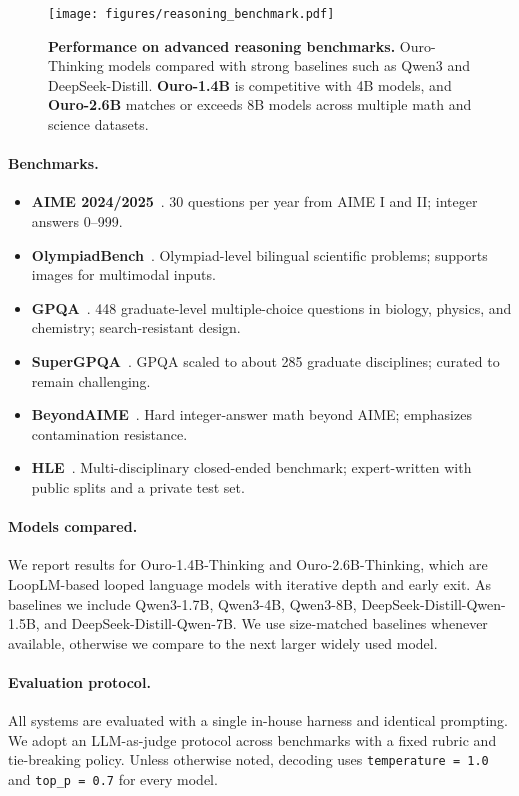 \documentclass[]{bytedance_seed}
\newcommand{\1}{\mathbf{1}}
\newcommand{\ut}{LoopLM}
\begin{document}
\begin{figure}[htbp]
  \centering
  \texttt{[image: figures/reasoning\_benchmark.pdf]}
  \caption{\textbf{Performance on advanced reasoning benchmarks.} Ouro-Thinking models compared with strong baselines such as Qwen3 and DeepSeek-Distill. \textbf{Ouro-1.4B} is competitive with 4B models, and \textbf{Ouro-2.6B} matches or exceeds 8B models across multiple math and science datasets.}
  \label{fig:reasoning_benchmark}
\end{figure}

\paragraph{Benchmarks.}
\begin{itemize}
  \item \textbf{AIME 2024/2025}~\cite{HuggingFaceH4_2024_AIME2024}. 30 questions per year from AIME I and II; integer answers 0--999.
  \item \textbf{OlympiadBench}~\cite{He2024OlympiadBench}. Olympiad-level bilingual scientific problems; supports images for multimodal inputs.
  \item \textbf{GPQA}~\cite{rein2023gpqa}. 448 graduate-level multiple-choice questions in biology, physics, and chemistry; search-resistant design.
  \item \textbf{SuperGPQA}~\cite{MAPTeam2025SuperGPQA}. GPQA scaled to about 285 graduate disciplines; curated to remain challenging.
  \item \textbf{BeyondAIME}~\cite{ByteDanceSeed_2025_BeyondAIME}. Hard integer-answer math beyond AIME; emphasizes contamination resistance.
  \item \textbf{HLE}~\cite{Phan2025HLE}. Multi-disciplinary closed-ended benchmark; expert-written with public splits and a private test set.
\end{itemize}

\paragraph{Models compared.}
We report results for Ouro-1.4B-Thinking and Ouro-2.6B-Thinking, which are \ut{}-based looped language models with iterative depth and early exit. As baselines we include Qwen3-1.7B, Qwen3-4B, Qwen3-8B, DeepSeek-Distill-Qwen-1.5B, and DeepSeek-Distill-Qwen-7B. We use size-matched baselines whenever available, otherwise we compare to the next larger widely used model.

\paragraph{Evaluation protocol.}
All systems are evaluated with a single in-house harness and identical prompting. We adopt an LLM-as-judge protocol across benchmarks with a fixed rubric and tie-breaking policy. Unless otherwise noted, decoding uses \texttt{temperature = 1.0} and \texttt{top\_p = 0.7} for every model.
\end{document}
